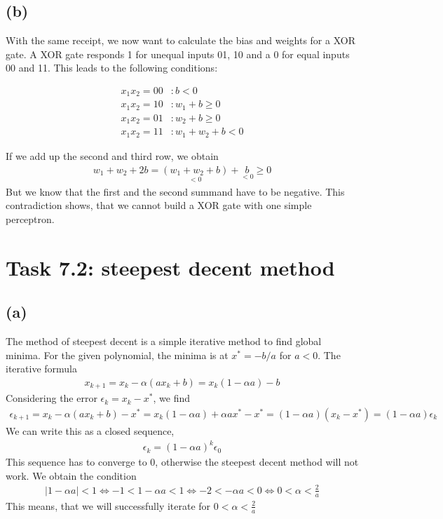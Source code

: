 \documentclass{article}
\begin{document}
\subsection*{(b)}
With the same receipt, we now want to calculate the bias and weights for a XOR gate. A XOR gate responds 1 for unequal inputs 01, 10 and a 0 for equal inputs 00 and 11. This leads to the following conditions:

\begin{align}
x_1x_2 = 00 &: b < 0 \\
x_1x_2 = 10 &: w_1 + b \ge 0 \\
x_1x_2 = 01 &: w_2 + b \ge 0 \\
x_1x_2 = 11 &: w_1 + w_2 + b < 0
\end{align}

If we add up the second and third row, we obtain
\begin{align}
w_1 + w_2 + 2b  = \underset{<0}{(w_1 + w_2 + b)} + \underset{<0}{b} \ge 0
\end{align}
But we know that the first and the second summand have to be negative. This contradiction shows, that we cannot build a XOR gate with one simple perceptron.

\section*{Task 7.2: steepest decent method}
\subsection*{(a)}
The method of steepest decent is a simple iterative method to find global minima. For the given polynomial, the minima is at $x^* = - b/a$ for $a<0$. The iterative formula
\begin{align}
x_{k+1} = x_k - \alpha \left( a x_k + b \right) = x_k (1-\alpha a) - b
\end{align}
Considering the error $\epsilon_k = x_k - x^*$, we find
\begin{align}
\epsilon_{k+1} = x_k - \alpha \left( a x_k + b \right) - x^* = x_k (1-\alpha a) + \alpha a x^* - x^* = (1-\alpha a) (x_k - x^*) = (1-\alpha a) \epsilon_k
\end{align}
We can write this as a closed sequence,
\begin{align}
\epsilon_{k}  = (1 - \alpha a)^k \epsilon_0
\end{align}
This sequence has to converge to 0, otherwise the steepest decent method will not work. We obtain the condition
\begin{align}
|1-\alpha a| < 1 \iff -1 < 1-\alpha a < 1 \iff -2 < -\alpha a < 0 \iff 0 < \alpha < \frac{2}{a}
\end{align}
This means, that we will successfully iterate for $0 < \alpha < \frac{2}{a}$
\end{document}
